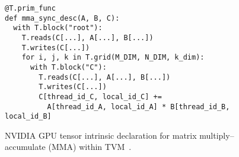 \begin{figure}[H]
\begin{verbatim}
@T.prim_func
def mma_sync_desc(A, B, C):
  with T.block("root"):
    T.reads(C[...], A[...], B[...])
    T.writes(C[...])
    for i, j, k in T.grid(M_DIM, N_DIM, k_dim):
      with T.block("C"):
        T.reads(C[...], A[...], B[...])
        T.writes(C[...])
        C[thread_id_C, local_id_C] +=
          A[thread_id_A, local_id_A] * B[thread_id_B, local_id_B]
\end{verbatim}
    \centering
    \caption{
NVIDIA GPU tensor 
  intrinsic declaration
  for matrix multiply--accumulate
  (MMA)
  within TVM~\cite{tvmcudatensorintrin}.
    }
    \label{fig:intro:tvmcudatensorintrin}
\end{figure}

